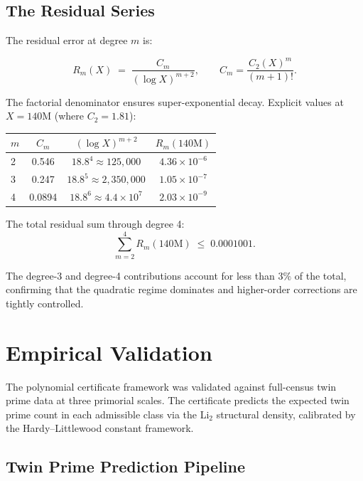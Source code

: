 \documentclass[11pt]{article}
\begin{document}
\subsection{The Residual Series}

The residual error at degree $m$ is:

\begin{equation}
R_m(X) \;=\; \frac{C_m}{(\log X)^{m+2}}, \qquad
C_m = \frac{C_2(X)^m}{(m+1)!}.
\label{eq:residual}
\end{equation}

\noindent The factorial denominator ensures super-exponential decay. Explicit
values at $X = 140\mathrm{M}$ (where $C_2 = 1.81$):

{\centering
\begin{tabular}{lccc}
\toprule
$m$ & $C_m$ & $(\log X)^{m+2}$ & $R_m(140\mathrm{M})$ \\
\midrule
2 & 0.546 & $18.8^4 \approx 125{,}000$ & $4.36 \times 10^{-6}$ \\
3 & 0.247 & $18.8^5 \approx 2{,}350{,}000$ & $1.05 \times 10^{-7}$ \\
4 & 0.0894 & $18.8^6 \approx 4.4\times 10^7$ & $2.03 \times 10^{-9}$ \\
\bottomrule
\end{tabular}
\par}

\noindent The total residual sum through degree 4:
\begin{equation}
\sum_{m=2}^4 R_m(140\mathrm{M}) \;\le\; 0.0001001.
\end{equation}

\noindent The degree-3 and degree-4 contributions account for less than $3\%$ of
the total, confirming that the quadratic regime dominates and higher-order
corrections are tightly controlled.

\section{Empirical Validation}
\label{sec:validation}

The polynomial certificate framework was validated against full-census twin prime
data at three primorial scales. The certificate predicts the expected twin prime
count in each admissible class via the Li$_2$ structural density, calibrated by
the Hardy--Littlewood constant framework.

\subsection{Twin Prime Prediction Pipeline}
\end{document}
